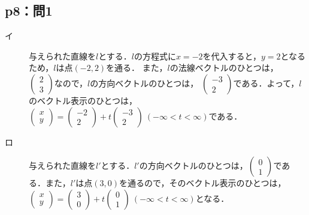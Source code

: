 \documentclass[uplatex,dvipdfmx,a4paper,10pt,fleqn]{jsarticle}
\begin{document}
\newpage

\subsection*{p8：問1}

\begin{tleftbar}
	\begin{description}
        \item[イ] 
    与えられた直線を$l$とする．$l$の方程式に$x=-2$を代入すると，$y=2$となるため，$l$は点$(-2,2)$を通る．
	また，$l$の法線ベクトルのひとつは，
	$
		\begin{pmatrix}
			2 \\
			3
		\end{pmatrix}
		$なので，$l$の方向ベクトルのひとつは，
		$
		\begin{pmatrix}
			-3 \\
			2
		\end{pmatrix}
		$である．よって，$l$のベクトル表示のひとつは，
		$
		\begin{pmatrix}
			x \\
			y
		\end{pmatrix}
		= 
		\begin{pmatrix}
		-2 \\
		2
		\end{pmatrix}
		+t 
			\begin{pmatrix}
				-3 \\
				2
			\end{pmatrix}
			~(-\infty < t < \infty)$である．\\

			\item[ロ]
            与えられた直線を$l'$とする．$l '$の方向ベクトルのひとつは，$
				\begin{pmatrix}
					0 \\
					1
				\end{pmatrix}
			$である．また，$l '$は点$(3,0)$を通るので，そのベクトル表示のひとつは，
			$
				\begin{pmatrix}
					x \\
					y
				\end{pmatrix}
			= 
				\begin{pmatrix}
				3 \\
				0
				\end{pmatrix}
			+t 
				\begin{pmatrix}
					0 \\
					1
                    \end{pmatrix}
                     ~(-\infty < t < \infty)
				$となる．
                \end{description}
		\end{tleftbar}
		
\end{document}
